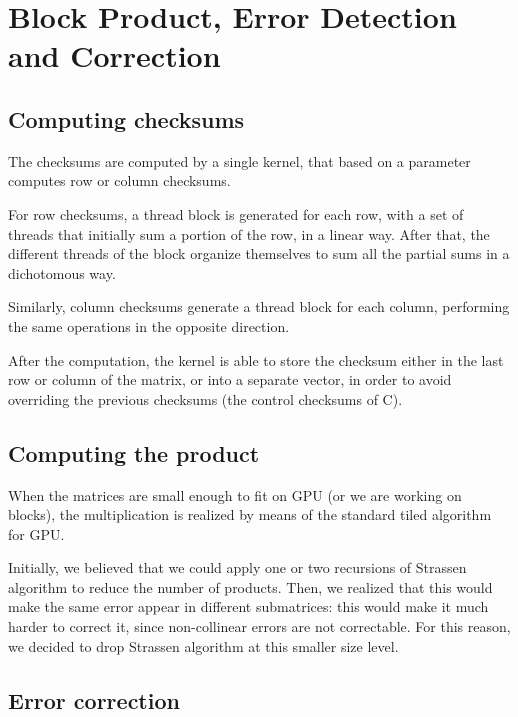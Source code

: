 \section{Block Product, Error Detection and Correction}
\label{sec:block}

\subsection{Computing checksums}

The checksums are computed by a single kernel, that based on a parameter computes row or column checksums.

For row checksums, a thread block is generated for each row, with a set of threads that initially sum a portion of the row, in a linear way.
After that, the different threads of the block organize themselves to sum all the partial sums in a dichotomous way.

Similarly, column checksums generate a thread block for each column, performing the same operations in the opposite direction.

After the computation, the kernel is able to store the checksum either in the last row or column of the matrix, or into a separate vector, in order to avoid overriding the previous checksums (the control checksums of C).


\subsection{Computing the product}

When the matrices are small enough to fit on GPU (or we are working on blocks), the multiplication is realized by means of the standard tiled algorithm for GPU.

Initially, we believed that we could apply one or two recursions of Strassen algorithm to reduce the number of products.
Then, we realized that this would make the same error appear in different submatrices: this would make it much harder to correct it, since non-collinear errors are not correctable.
For this reason, we decided to drop Strassen algorithm at this smaller size level.


\subsection{Error correction}
